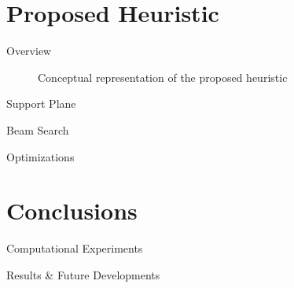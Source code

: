 \documentclass{beamer}
\begin{document}
    \section{Proposed Heuristic}
    \begin{frame}{Overview}
        \begin{figure}[h]
            \resizebox*{!}{.6\textheight}{%
            
            }
            \caption{Conceptual representation of the proposed heuristic}
            \label{fig:heur_scheme}
        \end{figure}
    \end{frame}
    \begin{frame}{Support Plane}
    \end{frame}
    \begin{frame}{Beam Search}
    \end{frame}
    \begin{frame}{Optimizations}
    \end{frame}

    \section{Conclusions}

    \begin{frame}{Computational Experiments}
    \end{frame}

    \begin{frame}{Results \& Future Developments}
    \end{frame}
\end{document}
